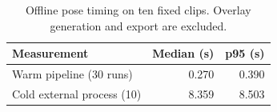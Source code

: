 \begin{table}[t]
\caption{Offline pose timing on ten fixed clips. Overlay generation and export are excluded.}
\label{tab:runtime}\centering
\begin{tabular}{lrr}
\toprule
Measurement & Median (s) & p95 (s)\\
\midrule
Warm pipeline (30 runs) & 0.270 & 0.390\\
Cold external process (10) & 8.359 & 8.503\\
\bottomrule
\end{tabular}
\end{table}
